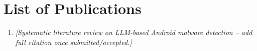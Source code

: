 \chapter*{List of Publications}
\label{publications}

\begin{enumerate}
\item \textit{[Systematic literature review on LLM-based Android malware
detection -- add full citation once submitted/accepted.]}
\end{enumerate}
